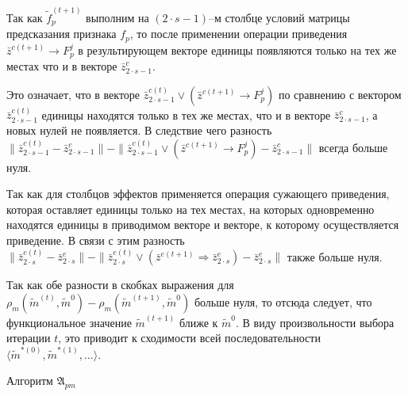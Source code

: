 \begin{Proof}
	Так как $\tilde f_p^{(t+1)}$ выполним на $(2\cdot s-1)$–м столбце условий матрицы предсказания признака $f_p$, то после применении операции приведения $\bar z^{c(t+1)}\rightarrow F_p^j$ в результирующем векторе единицы появляются только на тех же местах что и в векторе $\bar z_{2\cdot s-1}^c$. 
	
	Это означает, что в векторе $\bar z_{2\cdot s-1}^{c(t)}\vee(\bar z^{c(t+1)}\rightarrow F_p^j)$ по сравнению с вектором $\bar z_{2\cdot s-1}^{c(t)}$  единицы находятся только в тех же местах, что и в векторе $\bar z_{2\cdot s-1}^c$, а новых нулей не появляется. В следствие чего разность $\|\bar z_{2\cdot s-1}^{c(t)}-\bar z_{2\cdot s-1}^c\|-\|\bar z_{2\cdot s-1}^{c(t)}\vee(\bar z^{c(t+1)}\rightarrow F_p^j)-\bar z_{2\cdot s-1}^c\|$ всегда больше нуля.
	
	Так как для столбцов эффектов применяется операция сужающего приведения, которая оставляет единицы только на тех местах, на которых одновременно находятся единицы в приводимом векторе и векторе, к которому осуществляется приведение. В связи с этим разность $\|\bar z_{2\cdot s}^{e(t)}-\bar z_{2\cdot s}^e\|-\|\bar z_{2\cdot s}^{e(t)}\vee(\bar z^{e(t+1)}\Rightarrow\bar z_{2\cdot s}^e)-\bar z_{2\cdot s}^e\|$ также больше нуля.
	
	Так как обе разности в скобках выражения для $\rho_m(\tilde m^{(t)},\tilde m^0)-\rho_m(\tilde m^{(t+1)},\tilde m^0)$ больше нуля, то отсюда следует, что функциональное значение $\tilde m^{(t+1)}$ ближе к $\tilde m^0$. В виду произвольности выбора итерации $t$, это приводит к сходимости всей последовательности $\langle\tilde m^{*(0)},\tilde m^{*(1)},\dots\rangle$. 
\end{Proof}

\begin{algorithm}[H]
	\caption{Алгоритм $\mathfrak{A}_{pm}$}
	\label{alg:cycle_pm}
	\begin{algorithmic}[1]
		
	\end{algorithmic}
\end{algorithm}


\clearpage